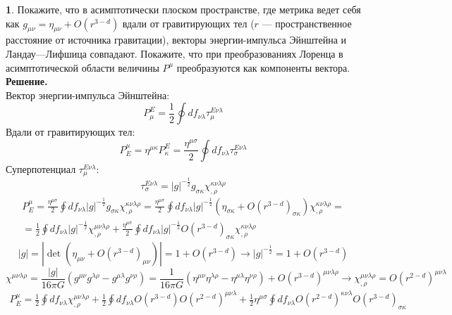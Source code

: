 \documentclass[12pt]{article}
\theoremstyle{definition}
\newtheorem{zad}{}[section]
\begin{document}
\begin{zad}
Покажите, что в асимптотически плоском пространстве, где метрика ведет себя как $g_{\mu\nu} = \eta_{\mu\nu} + O(r^{3-d})$ вдали от гравитирующих тел ($r$ — пространственное расстояние от источника гравитации), векторы энергии-импульса Эйнштейна и Ландау—Лифшица совпадают. Покажите, что при преобразованиях Лоренца в асимптотической области величины $P^\mu$ преобразуются как компоненты вектора.\\
\textbf{Решение.}\\
Вектор энергии-импульса Эйнштейна:
\begin{equation}
    P_\mu^E=\frac{1}{2}\oint df_{\nu\lambda}\tau^{E\nu\lambda}_\mu
\end{equation}
Вдали от гравитирующих тел:
\begin{equation}
    P^\mu_E=\eta^{\mu\kappa}P_\kappa^E=\frac{\eta^{\mu\sigma}}{2}\oint df_{\nu\lambda}\tau^{E\nu\lambda}_\sigma
\end{equation}
Суперпотенциал $\tau_\mu^{E\nu\lambda}$:
\begin{equation}
    \tau_\sigma^{E\nu\lambda}=|g|^{-\frac{1}{2}}g_{\sigma\kappa}\chi^{\kappa\nu\lambda\rho}_{,\rho}
\end{equation}
\begin{multline}
    P^\mu_E=\frac{\eta^{\mu\sigma}}{2}\oint df_{\nu\lambda}|g|^{-\frac{1}{2}}g_{\sigma\kappa}\chi^{\kappa\nu\lambda\rho}_{,\rho}=\frac{\eta^{\mu\sigma}}{2}\oint df_{\nu\lambda}|g|^{-\frac{1}{2}}(\eta_{\sigma\kappa}+O(r^{3-d})_{\sigma\kappa})\chi^{\kappa\nu\lambda\rho}_{,\rho}=\\=\frac{1}{2}\oint df_{\nu\lambda}|g|^{-\frac{1}{2}}\chi^{\mu\nu\lambda\rho}_{,\rho}+\frac{\eta^{\mu\sigma}}{2}\oint df_{\nu\lambda}|g|^{-\frac{1}{2}}O(r^{3-d})_{\sigma\kappa}\chi^{\kappa\nu\lambda\rho}_{,\rho}
\end{multline}
\begin{equation}
    |g|=|\det(\eta_{\mu\nu}+O(r^{3-d})_{\mu\nu})|=1+O(r^{3-d})\rightarrow |g|^{-\frac{1}{2}}=1+O(r^{3-d})
\end{equation}
\begin{equation*}
    \chi^{\mu\nu\lambda\rho}=\frac{|g|}{16\pi G}(g^{\mu\nu}g^{\lambda\rho}-g^{\mu\lambda}g^{\nu\rho})=\frac{1}{16\pi G}(\eta^{\mu\nu}\eta^{\lambda\rho}-\eta^{\mu\lambda}\eta^{\nu\rho})+O(r^{3-d})^{\mu\nu\lambda\rho}\rightarrow \chi^{\mu\nu\lambda\rho}_{,\rho}=O(r^{2-d})^{\mu\nu\lambda}
\end{equation*}
\begin{multline}
    P^\mu_E=\frac{1}{2}\oint df_{\nu\lambda}\chi^{\mu\nu\lambda\rho}_{,\rho}+\frac{1}{2}\oint df_{\nu\lambda}O(r^{3-d})O(r^{2-d})^{\mu\nu\lambda}+\frac{1}{2}\eta^{\mu\sigma}\oint df_{\nu\lambda}O(r^{2-d})^{\kappa\nu\lambda}O(r^{3-d})_{\sigma\kappa}

\end{multline}
\end{zad}
\end{document}
